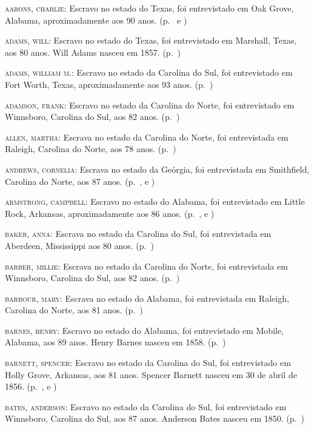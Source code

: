 \begin{Parskip}
\textsc{aarons, charlie:} Escravo no estado do Texas, foi entrevistado
em Oak Grove, Alabama, aproximadamente aos 90 anos. (p.~\pageref{ref01} e \pageref{ref02})

\textsc{adams, will:} Escravo no estado do Texas, foi entrevistado em
Marshall, Texas, aos 80 anos. Will Adams nasceu em 1857. (p.~\pageref{ref03})

\textsc{adams, william m.:} Escravo no estado da Carolina do Sul, foi
entrevistado em Fort Worth, Texas, aproximadamente aos 93 anos. (p.~\pageref{ref04})

\textsc{adamson, frank:} Escravo no estado da Carolina do Norte, foi
entrevistado em Winnsboro, Carolina do Sul, aos 82 anos. (p.~\pageref{ref05})

\textsc{allen, martha:} Escrava no estado da Carolina do Norte, foi
entrevistada em Raleigh, Carolina do Norte, aos 78 anos. (p.~\pageref{ref06})

\textsc{andrews, cornelia:} Escrava no estado da Geórgia, foi
entrevistada em Smithfield, Carolina do Norte, aos 87 anos. (p.~\pageref{ref07}, \pageref{ref08} e \pageref{ref09})

\textsc{armstrong, campbell:} Escravo no estado do Alabama, foi
entrevistado em Little Rock, Arkansas, aproximadamente aos 86 anos. (p.~\pageref{ref10}, \pageref{ref11} e \pageref{ref12})

\textsc{baker, anna:} Escrava no estado da Carolina do Sul, foi
entrevistada em Aberdeen, Mississippi aos 80 anos. (p.~\pageref{ref13})

\textsc{barber, millie:} Escrava no estado da Carolina do Norte, foi
entrevistada em Winnsboro, Carolina do Sul, aos 82 anos. (p.~\pageref{ref14})

\textsc{barbour, mary:} Escrava no estado do Alabama, foi entrevistada
em Raleigh, Carolina do Norte, aos 81 anos. (p.~\pageref{ref15})

\textsc{barnes, henry:} Escravo no estado do Alabama, foi entrevistado
em Mobile, Alabama, aos 89 anos. Henry Barnes nasceu em 1858. (p.~\pageref{ref16})

\textsc{barnett, spencer:} Escravo no estado da Carolina do Sul, foi
entrevistado em Holly Grove, Arkansas, aos 81 anos. Spencer Barnett
nasceu em 30 de abril de 1856. (p.~\pageref{ref17}, \pageref{ref18} e \pageref{ref19})

\textsc{bates, anderson:} Escravo no estado da Carolina do Sul, foi
entrevistado em Winnsboro, Carolina do Sul, aos 87 anos. Anderson Bates
nasceu em 1850. (p.~\pageref{ref20})


\end{Parskip}
